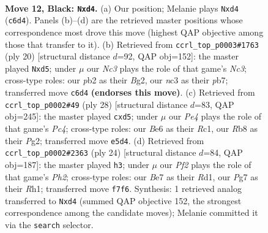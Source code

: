 \documentclass[11pt]{article}
\begin{document}
\clearpage

\begin{figure}[p]\centering
\begin{subfigure}{0.46\textwidth}\centering
\resizebox{\linewidth}{!}{%
\newchessgame
\chessboard[
  setfen={1r3rk1/ppp1bppp/1nnqb2P/4p3/P2PP3/2N2NP1/1P3PB1/R1BQK2R b KQ - 0 12},
  showmover=false,
  pgfstyle=straightmove, color=movearrow, markmove={c6-d4}
]}
\caption{}
\end{subfigure}\hfill
\begin{subfigure}{0.46\textwidth}\centering
\resizebox{\linewidth}{!}{%
\newchessgame
\chessboard[
  setfen={1rbqk2r/1pp1bppp/p4n2/3pN3/1np1P3/2N3P1/PP3PBP/R1BQ1RK1 w k - 0 11},
  showmover=false,
  pgfstyle=straightmove, color=movearrow, markmove={c3-d5}
]}
\caption{}
\end{subfigure}
\\[4pt]
\begin{subfigure}{0.46\textwidth}\centering
\resizebox{\linewidth}{!}{%
\newchessgame
\chessboard[
  setfen={2rqr1k1/1b2bppp/ppn1pn2/3p4/2P1P3/N1N1BP2/PP1QB1PP/2R2RK1 w - - 0 15},
  showmover=false,
  pgfstyle=straightmove, color=movearrow, markmove={c4-d5}
]}
\caption{}
\end{subfigure}\hfill
\begin{subfigure}{0.46\textwidth}\centering
\resizebox{\linewidth}{!}{%
\newchessgame
\chessboard[
  setfen={r1bqk2r/4bpp1/2p1pn2/p2p3p/4P3/1BN1BP2/PPPQ2PP/2KR3R w kq - 0 13},
  showmover=false,
  pgfstyle=straightmove, color=movearrow, markmove={h2-h3}
]}
\caption{}
\end{subfigure}
\caption{\textbf{Move 12, Black: \texttt{Nxd4}.} (a) Our position; Melanie plays \texttt{Nxd4} (\texttt{c6d4}). Panels (b)--(d) are the retrieved master positions whose correspondence most drove this move (highest QAP objective among those that transfer to it). (b) Retrieved from \texttt{ccrl\_top\_p0003\#1763} (ply 20) [structural distance $d$=92, QAP obj=152]: the master played \texttt{Nxd5}; under $\mu$ our \emph{Nc3} plays the role of that game's \emph{Nc3}; cross-type roles: our \emph{p}b2 as their \emph{B}g2, our \emph{n}c3 as their \emph{p}b7; transferred move \texttt{c6d4} \textbf{(endorses this move)}. (c) Retrieved from \texttt{ccrl\_top\_p0002\#49} (ply 28) [structural distance $d$=83, QAP obj=245]: the master played \texttt{cxd5}; under $\mu$ our \emph{Pe4} plays the role of that game's \emph{Pc4}; cross-type roles: our \emph{B}e6 as their \emph{R}c1, our \emph{R}b8 as their \emph{P}g2; transferred move \texttt{e5d4}. (d) Retrieved from \texttt{ccrl\_top\_p0002\#2363} (ply 24) [structural distance $d$=84, QAP obj=187]: the master played \texttt{h3}; under $\mu$ our \emph{Pf2} plays the role of that game's \emph{Ph2}; cross-type roles: our \emph{B}e7 as their \emph{R}d1, our \emph{P}g7 as their \emph{R}h1; transferred move \texttt{f7f6}. Synthesis: 1 retrieved analog transferred to \texttt{Nxd4} (summed QAP objective 152, the strongest correspondence among the candidate moves); Melanie committed it via the \texttt{search} selector.}
\label{fig:thought-m23}
\end{figure}
\end{document}

